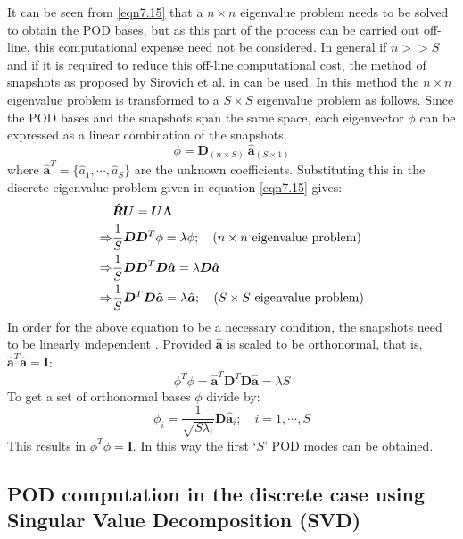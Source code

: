 \documentclass[10pt,letterpaper, onecolumn]{article}
\begin{document}
It can be seen from \eqref{eqn7.15} that a $n \times n$ eigenvalue problem needs to be solved to obtain the POD bases, but as this part of the process can be carried out off-line, this computational expense need not be considered. In general if $n >> S$ and if it is required to reduce this off-line computational cost, the method of snapshots as proposed by Sirovich et al. in \cite{sirovich1987low} can be used. In this method the $n \times n$ eigenvalue problem is transformed to a $S \times S$ eigenvalue problem as follows. Since the POD bases and the snapshots span the same space, each eigenvector $\phi$ can be expressed as a linear combination of the snapshots. 
%
\begin{equation}
\phi = \bm{D}_{(n \times S)} \  \hat{\bm{a}}_{(S \times 1)}
\end{equation}
%
where $\hat{\bm{a}}^T = \{  \hat{a}_1, \cdots,   \hat{a}_S\}$  are the unknown coefficients. Substituting this in the discrete eigenvalue problem given in equation \eqref{eqn7.15} gives:
%
\begin{align}
&\hat{\bm{R}} \bm{U} =  \bm{U} \bm{\Lambda} \notag \\
 \Rightarrow &\frac{1}{S} \bm{D} \bm{D}^T \phi = \lambda \phi; \quad (n \times n \text{ eigenvalue problem}) \notag \\
\Rightarrow &\frac{1}{S} \bm{D} \bm{D}^T  \bm{D} \hat{\bm{a}} = \lambda \bm{D} \hat{\bm{a}} \notag \\
\Rightarrow &\frac{1}{S} \bm{D}^T  \bm{D} \hat{\bm{a}} = \lambda \hat{\bm{a}}; \quad  (S \times S \text{ eigenvalue problem})
\end{align}
%
In order for the above equation to be a necessary condition, the snapshots need to be linearly independent \cite{ philipbook2012turbulence}. Provided $\hat{\bm{a}}$ is scaled to be orthonormal, that is, $\hat{\bm{a}}^T \hat{\bm{a}} = \bm{I}$:
%
\begin{equation}
\phi^T \phi = \hat{\bm{a}}^T \bm{D}^T  \bm{D} \hat{\bm{a}} = \lambda S
\end{equation}
%
To get a set of orthonormal bases $\phi$ divide by:
%
\begin{equation}
\phi_i = \frac{1}{\sqrt{S \lambda_i}}  \bm{D} \hat{\bm{a}}_i; \quad i = 1, \cdots, S
\end{equation}
%
This results in $\phi^T \phi = \bm{I}$. In this way the first `$S$' POD modes can be obtained. 


\subsection{POD computation in the discrete case using Singular Value Decomposition (SVD)}
\end{document}

